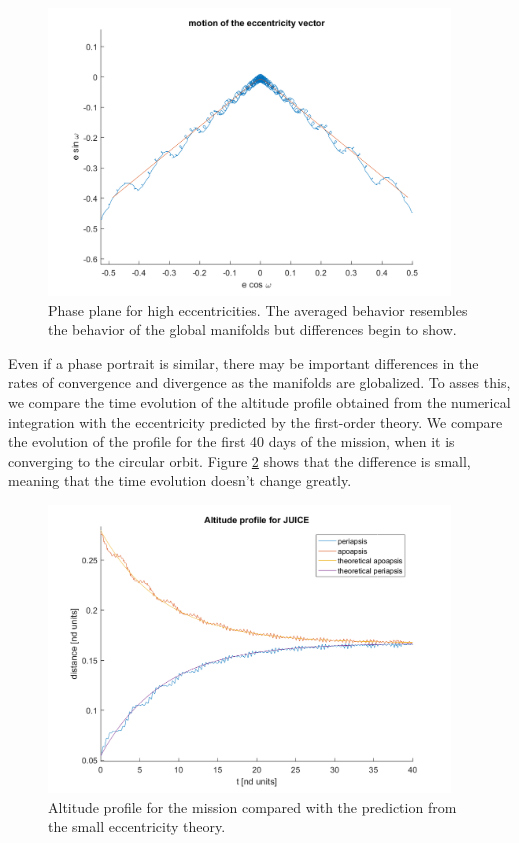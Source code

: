 \begin{figure}[H]
	\centering
	\includegraphics[height=3in]
	{figures/GanymedeESA/eccentricityComparison.png}
	\caption{Phase plane for high eccentricities. The averaged behavior resembles the behavior of the global manifolds but differences begin to show.}
	\label{fig:eccentricityComparisonGlobal}
\end{figure}

Even if a phase portrait is similar, there may be important differences in the rates of convergence and divergence as the manifolds are globalized. To asses this, we compare the time evolution of the altitude profile obtained from the numerical integration with the eccentricity predicted by the first-order theory. We compare the evolution of the profile for the first 40 days of the mission, when it is converging to the circular orbit. Figure \ref{fig:missionProfileTheoretical} shows that the difference is small, meaning that the time evolution doesn't change greatly.

\begin{figure}[H]
	\centering
	\includegraphics[height=3in]
	{figures/GanymedeESA/missionProfileTheoretical.png}
	\caption{Altitude profile for the mission compared with the prediction from the small eccentricity theory.}
	\label{fig:missionProfileTheoretical}
\end{figure}

